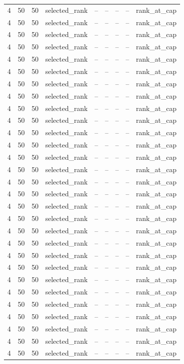 \begin{longtable}{lllllllll}
4 & 50 & 50 & selected\_rank & -- & -- & -- & -- & rank\_at\_cap \\
4 & 50 & 50 & selected\_rank & -- & -- & -- & -- & rank\_at\_cap \\
4 & 50 & 50 & selected\_rank & -- & -- & -- & -- & rank\_at\_cap \\
4 & 50 & 50 & selected\_rank & -- & -- & -- & -- & rank\_at\_cap \\
4 & 50 & 50 & selected\_rank & -- & -- & -- & -- & rank\_at\_cap \\
4 & 50 & 50 & selected\_rank & -- & -- & -- & -- & rank\_at\_cap \\
4 & 50 & 50 & selected\_rank & -- & -- & -- & -- & rank\_at\_cap \\
4 & 50 & 50 & selected\_rank & -- & -- & -- & -- & rank\_at\_cap \\
4 & 50 & 50 & selected\_rank & -- & -- & -- & -- & rank\_at\_cap \\
4 & 50 & 50 & selected\_rank & -- & -- & -- & -- & rank\_at\_cap \\
4 & 50 & 50 & selected\_rank & -- & -- & -- & -- & rank\_at\_cap \\
4 & 50 & 50 & selected\_rank & -- & -- & -- & -- & rank\_at\_cap \\
4 & 50 & 50 & selected\_rank & -- & -- & -- & -- & rank\_at\_cap \\
4 & 50 & 50 & selected\_rank & -- & -- & -- & -- & rank\_at\_cap \\
4 & 50 & 50 & selected\_rank & -- & -- & -- & -- & rank\_at\_cap \\
4 & 50 & 50 & selected\_rank & -- & -- & -- & -- & rank\_at\_cap \\
4 & 50 & 50 & selected\_rank & -- & -- & -- & -- & rank\_at\_cap \\
4 & 50 & 50 & selected\_rank & -- & -- & -- & -- & rank\_at\_cap \\
4 & 50 & 50 & selected\_rank & -- & -- & -- & -- & rank\_at\_cap \\
4 & 50 & 50 & selected\_rank & -- & -- & -- & -- & rank\_at\_cap \\
4 & 50 & 50 & selected\_rank & -- & -- & -- & -- & rank\_at\_cap \\
4 & 50 & 50 & selected\_rank & -- & -- & -- & -- & rank\_at\_cap \\
4 & 50 & 50 & selected\_rank & -- & -- & -- & -- & rank\_at\_cap \\
4 & 50 & 50 & selected\_rank & -- & -- & -- & -- & rank\_at\_cap \\
4 & 50 & 50 & selected\_rank & -- & -- & -- & -- & rank\_at\_cap \\
4 & 50 & 50 & selected\_rank & -- & -- & -- & -- & rank\_at\_cap \\
4 & 50 & 50 & selected\_rank & -- & -- & -- & -- & rank\_at\_cap \\
4 & 50 & 50 & selected\_rank & -- & -- & -- & -- & rank\_at\_cap \\
4 & 50 & 50 & selected\_rank & -- & -- & -- & -- & rank\_at\_cap \\
\bottomrule
\end{longtable}
\endgroup
